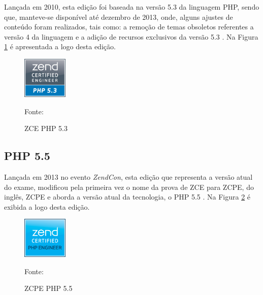Lançada em 2010, esta edição foi baseada na versão 5.3 da linguagem \acs{PHP},
sendo que, manteve-se disponível até dezembro de 2013, onde, alguns ajustes de
conteúdo foram realizados, tais como: a remoção de temas obsoletos referentes a versão 4
da linguagem e a adição de recursos exclusivos da versão 5.3
\cite{entrevistaAriZCEBrasil}. Na Figura \ref{fig:logoCertificationPHP53} é
apresentada a logo desta edição.

\begin{figure}[h!tb]
	\caption{ZCE PHP 5.3}
	\label{fig:logoCertificationPHP53}

	\centering
	\includegraphics[width=0.19\textwidth]{images/logo/php5-3.png}

	\centering
	\footnotesize Fonte: 
\end{figure}

\FloatBarrier 	%


\subsection{PHP 5.5}

Lançada em 2013 no evento \textit{ZendCon}, esta edição que representa a versão
atual do exame, modificou pela primeira vez o nome da prova de \acs{ZCE} para
\acs{ZCPE}, do inglês, \acl{ZCPE} e aborda a versão atual da tecnologia, o
PHP 5.5 \cite{entrevistaAriZCEBrasil}. Na Figura \ref{fig:logoCertificationPHP55} é
exibida a logo desta edição.

\begin{figure}[h!tb]
	\caption{ZCPE PHP 5.5}
	\label{fig:logoCertificationPHP55}

	\centering
	\includegraphics[width=0.19\textwidth]{images/logo/php5-5.png}

	\centering
	\footnotesize Fonte: 
\end{figure}

\FloatBarrier 	%

